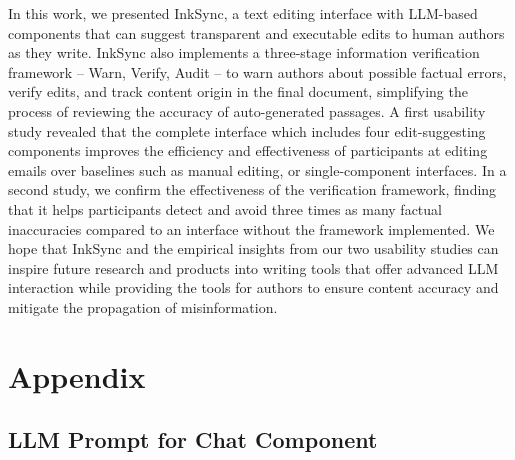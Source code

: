 \documentclass[manuscript]{acmart}
\begin{document}
In this work, we presented InkSync, a text editing interface with LLM-based components that can suggest transparent and executable edits to human authors as they write. InkSync also implements a three-stage information verification framework -- Warn, Verify, Audit -- to warn authors about possible factual errors, verify edits, and track content origin in the final document, simplifying the process of reviewing the accuracy of auto-generated passages. A first usability study revealed that the complete interface which includes four edit-suggesting components improves the efficiency and effectiveness of participants at editing emails over baselines such as manual editing, or single-component interfaces. In a second study, we confirm the effectiveness of the verification framework, finding that it helps participants detect and avoid three times as many factual inaccuracies compared to an interface without the framework implemented. We hope that InkSync and the empirical insights from our two usability studies can inspire future research and products into writing tools that offer advanced LLM interaction while providing the tools for authors to ensure content accuracy and mitigate the propagation of misinformation.





\appendix

\section{Appendix}

\subsection{LLM Prompt for Chat Component} \label{app:llm_chat_prompt}
\end{document}
